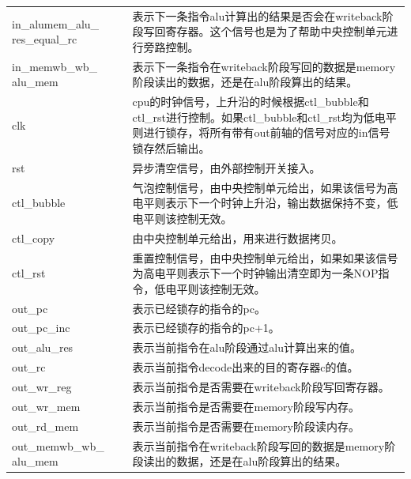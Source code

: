 \begin{center}
\begin{longtable}{p{}p{}}
        in\_alumem\_alu\_  res\_equal\_rc & 表示下一条指令alu计算出的结果是否会在writeback阶段写回寄存器。这个信号也是为了帮助中央控制单元进行旁路控制。\\
        in\_memwb\_wb\_  alu\_mem & 表示下一条指令在writeback阶段写回的数据是memory阶段读出的数据，还是在alu阶段算出的结果。\\
        clk & cpu的时钟信号，上升沿的时候根据ctl\_bubble和ctl\_rst进行控制。如果ctl\_bubble和ctl\_rst均为低电平则进行锁存，将所有带有out前轴的信号对应的in信号锁存然后输出。\\
        rst & 异步清空信号，由外部控制开关接入。\\
        ctl\_bubble &  气泡控制信号，由中央控制单元给出，如果该信号为高电平则表示下一个时钟上升沿，输出数据保持不变，低电平则该控制无效。\\
        ctl\_copy &  由中央控制单元给出，用来进行数据拷贝。\\
        ctl\_rst &  重置控制信号，由中央控制单元给出，如果如果该信号为高电平则表示下一个时钟输出清空即为一条NOP指令，低电平则该控制无效。\\
        out\_pc &  表示已经锁存的指令的pc。\\
        out\_pc\_inc &  表示已经锁存的指令的pc+1。\\
        out\_alu\_res & 表示当前指令在alu阶段通过alu计算出来的值。\\
        out\_rc & 表示当前指令decode出来的目的寄存器c的值。\\
        out\_wr\_reg &  表示当前指令是否需要在writeback阶段写回寄存器。\\
        out\_wr\_mem &  表示当前指令是否需要在memory阶段写内存。\\
        out\_rd\_mem &  表示当前指令是否需要在memory阶段读内存。\\
        out\_memwb\_wb\_  alu\_mem & 表示当前指令在writeback阶段写回的数据是memory阶段读出的数据，还是在alu阶段算出的结果。\\
        \bottomrule
    \end{longtable}
\end{center}

